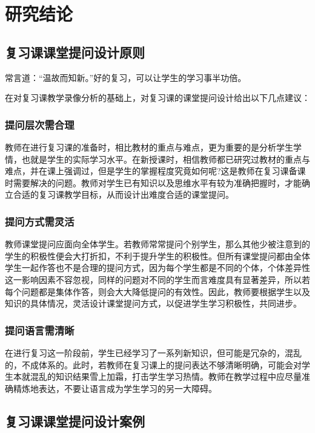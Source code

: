 \chapter{研究结论}


\section{复习课课堂提问设计原则}

常言道：“温故而知新。”好的复习，可以让学生的学习事半功倍。

在对复习课教学录像分析的基础上，对复习课的课堂提问设计给出以下几点建议：


\subsection{提问层次需合理}

教师在进行复习课的准备时，相比教材的重点与难点，更为重要的是分析学生学情，也就是学生的实际学习水平。在新授课时，相信教师都已研究过教材的重点与难点，并在课上强调过，但是学生的掌握程度究竟如何呢?这是教师在复习课备课时需要解决的问题。教师对学生已有知识以及思维水平有较为准确把握时，才能确立合适的复习课教学目标，从而设计出难度合适的课堂提问。


\subsection{提问方式需灵活}

教师课堂提问应面向全体学生。若教师常常提问个别学生，那么其他少被注意到的学生的积极性便会大打折扣，不利于提升学生的积极性。但所有课堂提问都由全体学生一起作答也不是合理的提问方式，因为每个学生都是不同的个体，个体差异性这一影响因素不容忽视，同样的问题对不同的学生而言难度具有显著差异，所以若每个问题都是集体作答，则会大大降低提问的有效性。因此，教师要根据学生以及知识的具体情况，灵活设计课堂提问方式，以促进学生学习积极性，共同进步。


\subsection{提问语言需清晰}

在进行复习这一阶段前，学生已经学习了一系列新知识，但可能是冗杂的，混乱的，不成体系的。此时，若教师在复习课上的提问表达不够清晰明确，可能会对学生本就混乱的知识结果雪上加霜，打击学生学习热情。教师在教学过程中应尽量准确精炼地表达，不要让语言成为学生学习的另一大障碍。



\section{复习课课堂提问设计案例}

